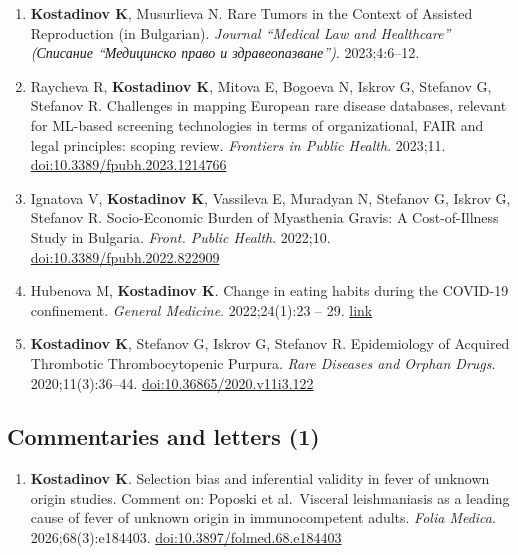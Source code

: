 \documentclass[
  10.5pt,
  a4paper,
  DIV=11,
  numbers=noendperiod]{scrartcl}
\providecommand{\tightlist}{%
  \setlength{\itemsep}{0pt}\setlength{\parskip}{0pt}}
\begin{document}
\begin{enumerate}
\item
  \textbf{Kostadinov K}, Musurlieva N. Rare Tumors in the Context of
  Assisted Reproduction (in Bulgarian). \emph{Journal ``Medical Law and
  Healthcare'' (Списание ``Медицинско право и здравеопазване'')}.
  2023;4:6--12.
\item
  Raycheva R, \textbf{Kostadinov K}, Mitova E, Bogoeva N, Iskrov G,
  Stefanov G, Stefanov R. Challenges in mapping European rare disease
  databases, relevant for ML-based screening technologies in terms of
  organizational, FAIR and legal principles: scoping review.
  \emph{Frontiers in Public Health}. 2023;11.
  \href{https://doi.org/10.3389/fpubh.2023.1214766}{doi:10.3389/fpubh.2023.1214766}
\item
  Ignatova V, \textbf{Kostadinov K}, Vassileva E, Muradyan N, Stefanov
  G, Iskrov G, Stefanov R. Socio-Economic Burden of Myasthenia Gravis: A
  Cost-of-Illness Study in Bulgaria. \emph{Front. Public Health}.
  2022;10.
  \href{https://doi.org/10.3389/fpubh.2022.822909}{doi:10.3389/fpubh.2022.822909}
\item
  Hubenova M, \textbf{Kostadinov K}. Change in eating habits during the
  COVID-19 confinement. \emph{General Medicine}. 2022;24(1):23 -- 29.
  \href{https://www.scopus.com/inward/record.uri?eid=2-s2.0-85131335656&partnerID=40&md5=960321f2fcf677479ecd9d43d8f6d6d0}{link}
\item
  \textbf{Kostadinov K}, Stefanov G, Iskrov G, Stefanov R. Epidemiology
  of Acquired Thrombotic Thrombocytopenic Purpura. \emph{Rare Diseases
  and Orphan Drugs}. 2020;11(3):36--44.
  \href{https://doi.org/10.36865/2020.v11i3.122}{doi:10.36865/2020.v11i3.122}
\end{enumerate}

\subsection{Commentaries and letters
(1)}\label{commentaries-and-letters-1}

\begin{enumerate}
\def\labelenumi{\arabic{enumi}.}
\setcounter{enumi}{48}
\tightlist
\item
  \textbf{Kostadinov K}. Selection bias and inferential validity in
  fever of unknown origin studies. Comment on: Poposki et al.~Visceral
  leishmaniasis as a leading cause of fever of unknown origin in
  immunocompetent adults. \emph{Folia Medica}. 2026;68(3):e184403.
  \href{https://doi.org/10.3897/folmed.68.e184403}{doi:10.3897/folmed.68.e184403}
\end{enumerate}
\end{document}
